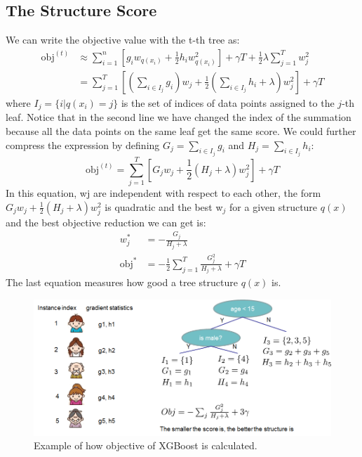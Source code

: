 \documentclass[a4paper, 12pt]{book} %
\begin{document}
\subsection{The Structure Score}
We can write the objective value with the t-th tree as:
\begin{equation}
\begin{split}\mathrm{obj}^{(t)} &\approx \sum_{i=1}^n [g_i w_{q(x_i)} + \frac{1}{2} h_i w_{q(x_i)}^2] + \gamma T + \frac{1}{2}\lambda \sum_{j=1}^T w_j^2\\
&= \sum^T_{j=1} [(\sum_{i\in I_j} g_i) w_j + \frac{1}{2} (\sum_{i\in I_j} h_i + \lambda) w_j^2 ] + \gamma T\end{split}
\end{equation}
where $I_j=\{i|q(x_i)=j\}$ is the set of indices of data points assigned to the $j$-th leaf. Notice that in the second line we have changed the index of the summation because all the data points on the same leaf get the same score. We could further compress the expression by defining $G_j = \sum_{i\in I_j} g_i$ and $H_j = \sum_{i\in I_j} h_i$:
\begin{equation}
\mathrm{obj}^{(t)} = \sum^T_{j=1} [G_jw_j + \frac{1}{2} (H_j+\lambda) w_j^2] +\gamma T
\end{equation}
In this equation, wj are independent with respect to each other, the form $G_jw_j+\frac{1}{2}(H_j+\lambda)w^2_j$ is quadratic and the best w$_j$ for a given structure $q(x)$ and the best objective reduction we can get is:
\begin{equation}
\begin{split}w_j^\ast &= -\frac{G_j}{H_j+\lambda}\\
\mathrm{obj}^\ast &= -\frac{1}{2} \sum_{j=1}^T \frac{G_j^2}{H_j+\lambda} + \gamma T\end{split}
\end{equation}
The last equation measures how good a tree structure $q(x)$ is.

\begin{figure}[htpb]
	\centering
	\includegraphics[width=13cm]{figures/xgboost_struct_score.png}
	\caption{Example of how objective of XGBoost is calculated.}
	\label{fig:boat1}
\end{figure}
\end{document}
